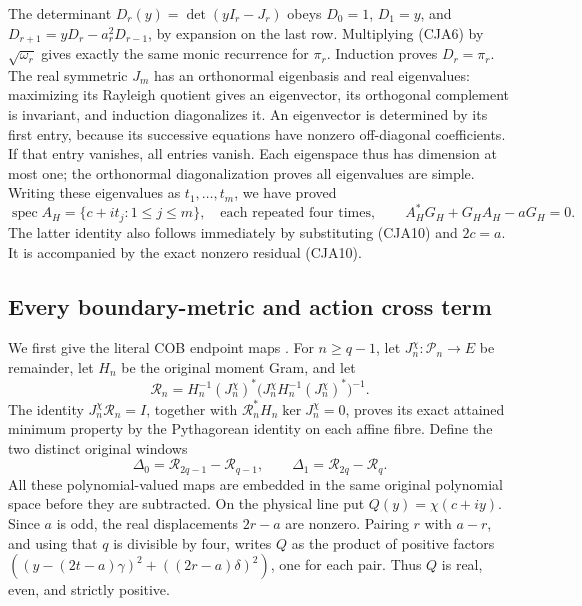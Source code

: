 The determinant \(D_r(y)=\det(yI_r-J_r)\) obeys
\(D_0=1\), \(D_1=y\), and
\(D_{r+1}=yD_r-a_r^2D_{r-1}\), by expansion on the last row.
Multiplying (CJA6) by \(\sqrt{\omega_r}\) gives exactly the same
monic recurrence for \(\pi_r\).
Induction proves \(D_r=\pi_r\).
The real symmetric \(J_m\) has an orthonormal eigenbasis and real
eigenvalues: maximizing its Rayleigh quotient gives an eigenvector,
its orthogonal complement is invariant, and induction diagonalizes it.
An eigenvector is determined by its first entry, because its
successive equations have nonzero off-diagonal coefficients.
If that entry vanishes, all entries vanish.  Each eigenspace thus has
dimension at most one; the orthonormal diagonalization proves all
eigenvalues are simple.
Writing these eigenvalues as \(t_1,\ldots,t_m\), we have proved
\begin{equation}
 \operatorname{spec}A_H=\{c+it_j:1\leq j\leq m\},
 \quad\text{each repeated four times},\qquad
 A_H^*G_H+G_HA_H-aG_H=0.
 \tag{CJA12}
\end{equation}
The latter identity also follows immediately by substituting
(CJA10) and \(2c=a\).
It is accompanied by the exact nonzero residual (CJA10).

\subsection{Every boundary-metric and action cross term}

We first give the literal COB endpoint maps \cite{prog:COB}.
For \(n\geq q-1\), let \(J_n^\chi:\mathcal P_n\to E\) be remainder,
let \(H_n\) be the original moment Gram, and let
\[
 \mathscr R_n=H_n^{-1}(J_n^\chi)^*
     \bigl(J_n^\chi H_n^{-1}(J_n^\chi)^*\bigr)^{-1}.
 \]
The identity \(J_n^\chi\mathscr R_n=I\), together with
\(\mathscr R_n^*H_n\ker J_n^\chi=0\), proves its exact attained
minimum property by the Pythagorean identity on each affine fibre.
Define the two distinct original windows
\[
 \Delta_0=\mathscr R_{2q-1}-\mathscr R_{q-1},\qquad
 \Delta_1=\mathscr R_{2q}-\mathscr R_q .
 \]
All these polynomial-valued maps are embedded in the same original
polynomial space before they are subtracted.
On the physical line put \(Q(y)=\chi(c+iy)\).
Since \(a\) is odd, the real displacements \(2r-a\) are nonzero.
Pairing \(r\) with \(a-r\), and using that \(q\) is divisible by
four, writes \(Q\) as the product of positive factors
\(((y-(2t-a)\gamma)^2+((2r-a)\delta)^2)\), one for each pair.
Thus \(Q\) is real, even, and strictly positive.

